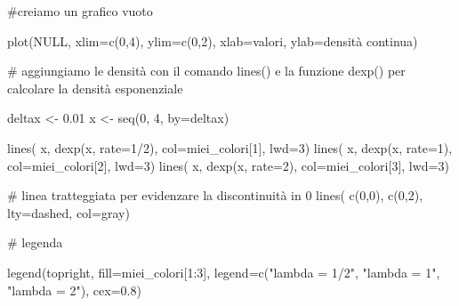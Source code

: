 \documentclass[
  italian,
  letterpaper,
]{book}
\newenvironment{Shaded}{\begin{snugshade}}{\end{snugshade}}
\newcommand{\AttributeTok}[1]{\textcolor[rgb]{0.40,0.45,0.13}{#1}}
\newcommand{\CommentTok}[1]{\textcolor[rgb]{0.37,0.37,0.37}{#1}}
\newcommand{\ConstantTok}[1]{\textcolor[rgb]{0.56,0.35,0.01}{#1}}
\newcommand{\DecValTok}[1]{\textcolor[rgb]{0.68,0.00,0.00}{#1}}
\newcommand{\FloatTok}[1]{\textcolor[rgb]{0.68,0.00,0.00}{#1}}
\newcommand{\FunctionTok}[1]{\textcolor[rgb]{0.28,0.35,0.67}{#1}}
\newcommand{\NormalTok}[1]{\textcolor[rgb]{0.00,0.23,0.31}{#1}}
\newcommand{\OtherTok}[1]{\textcolor[rgb]{0.00,0.23,0.31}{#1}}
\newcommand{\SpecialCharTok}[1]{\textcolor[rgb]{0.37,0.37,0.37}{#1}}
\newcommand{\StringTok}[1]{\textcolor[rgb]{0.13,0.47,0.30}{#1}}
\theoremstyle{definition}
\theoremstyle{remark}
\begin{document}
\begin{Shaded}
\begin{Highlighting}[]
\CommentTok{\#creiamo un grafico vuoto}

\FunctionTok{plot}\NormalTok{(}\ConstantTok{NULL}\NormalTok{, }\AttributeTok{xlim=}\FunctionTok{c}\NormalTok{(}\DecValTok{0}\NormalTok{,}\DecValTok{4}\NormalTok{), }\AttributeTok{ylim=}\FunctionTok{c}\NormalTok{(}\DecValTok{0}\NormalTok{,}\DecValTok{2}\NormalTok{), }\AttributeTok{xlab=}\StringTok{\textquotesingle{}valori\textquotesingle{}}\NormalTok{, }\AttributeTok{ylab=}\StringTok{\textquotesingle{}densità continua\textquotesingle{}}\NormalTok{)}

\CommentTok{\# aggiungiamo le densità con il comando lines() e la funzione dexp() per calcolare la densità esponenziale}

\NormalTok{deltax }\OtherTok{\textless{}{-}} \FloatTok{0.01}
\NormalTok{x }\OtherTok{\textless{}{-}} \FunctionTok{seq}\NormalTok{(}\DecValTok{0}\NormalTok{, }\DecValTok{4}\NormalTok{, }\AttributeTok{by=}\NormalTok{deltax)}

\FunctionTok{lines}\NormalTok{( x, }\FunctionTok{dexp}\NormalTok{(x, }\AttributeTok{rate=}\DecValTok{1}\SpecialCharTok{/}\DecValTok{2}\NormalTok{), }\AttributeTok{col=}\NormalTok{miei\_colori[}\DecValTok{1}\NormalTok{], }\AttributeTok{lwd=}\DecValTok{3}\NormalTok{)}
\FunctionTok{lines}\NormalTok{( x, }\FunctionTok{dexp}\NormalTok{(x, }\AttributeTok{rate=}\DecValTok{1}\NormalTok{), }\AttributeTok{col=}\NormalTok{miei\_colori[}\DecValTok{2}\NormalTok{], }\AttributeTok{lwd=}\DecValTok{3}\NormalTok{)}
\FunctionTok{lines}\NormalTok{( x, }\FunctionTok{dexp}\NormalTok{(x, }\AttributeTok{rate=}\DecValTok{2}\NormalTok{),  }\AttributeTok{col=}\NormalTok{miei\_colori[}\DecValTok{3}\NormalTok{], }\AttributeTok{lwd=}\DecValTok{3}\NormalTok{)}

\CommentTok{\# linea tratteggiata per evidenzare la discontinuità in 0}
\FunctionTok{lines}\NormalTok{( }\FunctionTok{c}\NormalTok{(}\DecValTok{0}\NormalTok{,}\DecValTok{0}\NormalTok{), }\FunctionTok{c}\NormalTok{(}\DecValTok{0}\NormalTok{,}\DecValTok{2}\NormalTok{), }\AttributeTok{lty=}\StringTok{\textquotesingle{}dashed\textquotesingle{}}\NormalTok{, }\AttributeTok{col=}\StringTok{\textquotesingle{}gray\textquotesingle{}}\NormalTok{)}


\CommentTok{\# legenda}

\FunctionTok{legend}\NormalTok{(}\StringTok{\textquotesingle{}topright\textquotesingle{}}\NormalTok{, }\AttributeTok{fill=}\NormalTok{miei\_colori[}\DecValTok{1}\SpecialCharTok{:}\DecValTok{3}\NormalTok{], }\AttributeTok{legend=}\FunctionTok{c}\NormalTok{(}\StringTok{"lambda = 1/2"}\NormalTok{, }\StringTok{"lambda = 1"}\NormalTok{, }\StringTok{"lambda = 2"}\NormalTok{), }\AttributeTok{cex=}\FloatTok{0.8}\NormalTok{)}
\end{Highlighting}
\end{Shaded}
\end{document}
